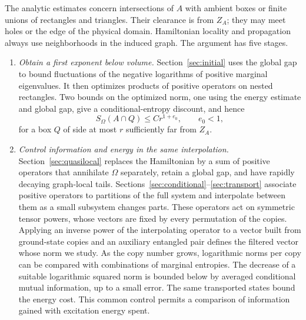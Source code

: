 The analytic estimates concern intersections of $A$ with ambient boxes or
finite unions of rectangles and triangles. Their clearance is from $Z_A$;
they may meet holes or the edge of the physical domain. Hamiltonian
locality and propagation always use neighborhoods in the induced graph.
The argument has five stages.
\begin{enumerate}[leftmargin=*,label=\arabic*.]
\item \emph{Obtain a first exponent below volume.}
Section~\ref{sec:initial} uses the global gap to bound fluctuations of the
negative logarithms of positive marginal eigenvalues. It then optimizes
products of positive operators on nested rectangles. Two bounds on the
optimized norm, one using the energy estimate and global gap, give a
conditional-entropy discount, and hence
\[
 S_\Omega(A\cap Q)\le Cr^{1+e_0},\qquad e_0<1,
\]
for a box $Q$ of side at most $r$ sufficiently far from $Z_A$.

\item \emph{Control information and energy in the same interpolation.}
Section~\ref{sec:quasilocal} replaces the Hamiltonian by a sum of positive
operators that annihilate $\Omega$ separately, retain a global gap, and
have rapidly decaying graph-local tails.
Sections~\ref{sec:conditional}--\ref{sec:transport} associate positive
operators to partitions of the full system and interpolate between them
as a small subsystem changes parts. These operators act on symmetric
tensor powers, whose vectors are fixed by every permutation of the copies.
Applying an inverse power of the interpolating operator to a vector built
from ground-state copies and an auxiliary entangled pair defines the
filtered vector whose norm we study. As the copy number grows, logarithmic
norms per copy can be compared with combinations of marginal entropies.
The decrease of a suitable logarithmic squared norm is bounded below by averaged conditional mutual
information, up to a small error. The same transported states bound the
energy cost. This common control permits a comparison of information
gained with excitation energy spent.


\end{enumerate}
